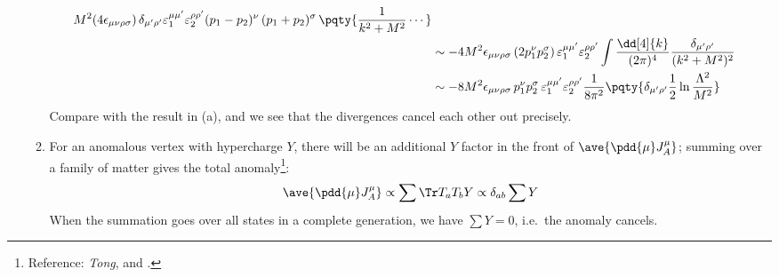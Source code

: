 \documentclass[a4paper,10pt]{article}
\begin{document}
\begin{enumerate}
\begin{enumerate}
\begin{gather}
\begin{aligned}
			M^2
			(4\epsilon_{\mu\nu\rho\sigma})\,
			\delta_{\mu'\rho'}
				\varepsilon^{\mu\mu'}_1
				\varepsilon^{\rho\rho'}_2
				(p_1 - p_2)^{\nu}\,
				(p_1 + p_2)^{\sigma}\,
			\pqty{
				\frac{1}{k^2 + M^2}
				\cdots
			} \\
		&\sim -4M^2 \epsilon_{\mu\nu\rho\sigma}\,
			(2p_1^\nu p_2^\sigma)\,
			\varepsilon_1^{\mu\mu'}
			\varepsilon_2^{\rho\rho'}
		\int \frac{\dd[4]{k}}{(2\pi)^4}
			\frac{
				\delta_{\mu'\rho'}
			}{(k^2 + M^2)^2} \\
		&\sim -8M^2 \epsilon_{\mu\nu\rho\sigma}\,
			p_1^\nu p_2^\sigma\,
			\varepsilon_1^{\mu\mu'}
			\varepsilon_2^{\rho\rho'}
			\frac{1}{8\pi^2}
			\pqty{
				\delta_{\mu'\rho'}
				\frac{1}{2}
					\ln \frac{\Lambda^2}{M^2}
			}
	\end{aligned}
	\end{gather}
	Compare with the result in (a), and we see that the divergences cancel each other out precisely. 
	
	\item For an anomalous vertex with hypercharge $Y$, there will be an additional $Y$ factor in the front of $\ave{\pdd{\mu} J^\mu_A}$; summing over a family of matter gives the total anomaly\footnote{
		Reference: \textit{Tong}, and . 
	}:
	\begin{equation}
		\ave{\pdd{\mu} J^\mu_A}
		\propto \sum \Tr T_a T_b Y
		\propto \delta_{ab} \sum Y
	\end{equation}
	When the summation goes over all states in a complete generation, we have $
		\sum Y = 0
	$, i.e.\ the anomaly cancels. 
	
	\end{enumerate}
	
	\end{enumerate}


\printbibliography[%
	,heading = bibintoc
]
\end{document}
